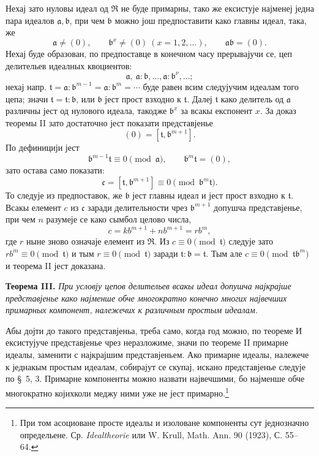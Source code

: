 \documentclass[11pt]{article}
\providecommand{\mR}{\mathfrak{R}}
\providecommand{\ma}{\mathfrak{a}}
\providecommand{\mb}{\mathfrak{b}}
\providecommand{\mc}{\mathfrak{c}}
\providecommand{\mt}{\mathfrak{t}}
\begin{document}
Нехај зато нуловы идеал од $\mR$ не буде примарны, тако же ексистује најменеј једна пара идеалов $\ma,\mb$, при чем $\mb$ можно још предпоставити како главны идеал, така, же
\[
\ma\ne(0),\qquad \mb^x\ne(0)\ (x=1,2,\ldots),
\qquad \ma\mb=(0).
\]
Нехај буде образован, по предпоставце в конечном часу прерывајучи се, цеп делительев идеалных квоциентов:
\[
\ma,\ \ma:\mb,\ldots,\ma:\mb^\nu,\ldots;
\]
нехај напр. $\mt=\ma:\mb^{m-1}=\ma:\mb^m=\cdots$ буде равен всим следујучим идеалам того цепа; значи $\mt=\mt:\mb$, или $\mb$ јест прост взходно к $\mt$. Далеј $\mt$ како делитель од $\ma$ различны јест од нулового идеала, такодже $\mb^x$ за всакы експонент $x$. За доказ теоремы II зато достаточно јест показати представјенье
\[
(0)=[\mt,\mb^{m+1}].
\]
По дефиницији јест
\[
\mb^{m-1}\mt\equiv0\pmod{\ma},\qquad \mb^m\mt=(0),
\]
зато остава само показати:
\[
\mc=[\mt,\mb^{m+1}]\equiv0\pmod{\mb^m\mt}.
\]
То следује из предпоставок, же $\mb$ јест главны идеал и јест прост взходно к $\mt$. Всакы елемент $c$ из $\mc$ заради делительности чрез $\mb^{m+1}$ допушча представјенье, при чем $n$ разумеје се како сымбол целово числа,
\[
 c=k b^{m+1}+n b^{m+1}=r b^m,
\]
где $r$ ныне зново означаје елемент из $\mR$. Из $c\equiv0\pmod{\mt}$ следује зато $r b^m\equiv0\pmod{\mt}$ и тым $r\equiv0\pmod{\mt}$ заради $\mt:\mb=\mt$. Тым але $c\equiv0\pmod{\mt\mb^m}$ и теорема II јест доказана.

\textbf{Теорема III.} \emph{При условју цепов делительев всакы идеал допушча најкрајше представјенье како најменше обче многократно конечно многих највечших примарных компонент, належечих к различным простым идеалам.}

Абы дојти до такого представјеньа, треба само, когда год можно, по теореме И ексистујуче представјенье чрез неразложиме, значи по теореме II примарне идеалы, заменити с најкрајшим представјеньем. Ако примарне идеалы, належече к једнакым простым идеалам, собирајут се скупај, искано представјенье следује по \S~5, 3. Примарне компоненты можно назвати највечшими, бо најменше обче многократно којихколи меджу ними уже не јест примарно.\footnote{При том асоциоване просте идеалы и изоловане компоненты сут једнозначно определьене. Ср. \emph{Idealtheorie} или W. Krull, Math. Ann. 90 (1923), С. 55--64.}
\end{document}
